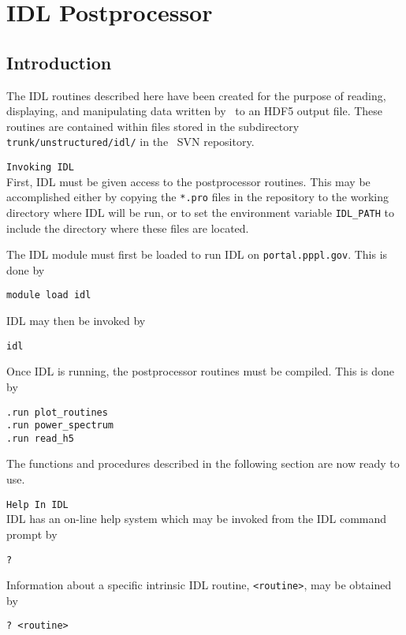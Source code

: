 \newcommand{\IDLf}[1]{\texttt{\textbf{#1}}}
\newcommand{\IDLa}[1]{\textit{#1}}
\newcommand{\IDLbool}{\texttt{bool}}
\newcommand{\IDLint}{\texttt{int}}
\newcommand{\IDLstr}{\texttt{string}}
\newcommand{\IDLflt}{\texttt{float}}
\newcommand{\IDLopt}[1]{$\langle$ #1 $\rangle$}

\section{IDL Postprocessor}\label{ch:setup-idl}

\subsection{Introduction}

The IDL routines described here have been created for the purpose of
reading, displaying, and manipulating data written by \codename\ to an
HDF5 output file.  These routines are contained within files stored in
the subdirectory \texttt{trunk/unstructured/idl/} in the \codename\ SVN
repository.

\texttt{Invoking IDL}
\\
First, IDL must be given access to the postprocessor routines.  This
may be accomplished either by copying the \texttt{*.pro} files in the
repository to the working directory where IDL will be run, or to set
the environment variable \texttt{IDL\_PATH} to include the directory
where these files are located.

The IDL module must first be loaded to run IDL on
\texttt{portal.pppl.gov}.  This is done by
\begin{verbatim}
module load idl
\end{verbatim}
IDL may then be invoked by
\begin{verbatim}
idl
\end{verbatim}
Once IDL is running, the postprocessor routines must be compiled.
This is done by
\begin{verbatim}
.run plot_routines
.run power_spectrum
.run read_h5
\end{verbatim}
The functions and procedures described in the following section are
now ready to use.

\texttt{Help In IDL}
\\

IDL has an on-line help system which may be invoked from the IDL
command prompt by
\begin{verbatim}
?
\end{verbatim}
Information about a specific intrinsic IDL routine,
\texttt{<routine>}, may be obtained by
\begin{verbatim}
? <routine>
\end{verbatim}


